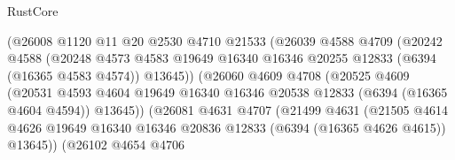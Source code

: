 \begin{lexlean}{RustCore}
\begin{coremodule}
                                (@26008
                                  @1120
                                  @11
                                  @20
                                  @2530
                                  @4710
                                  @21533
                                  (@26039
                                    @4588
                                    @4709
                                    (@20242
                                      @4588
                                      (@20248
                                        @4573
                                        @4583
                                        @19649
                                        @16340
                                        @16346
                                        @20255
                                        @12833
                                        (@6394 (@16365 @4583 @4574))
                                        @13645))
                                    (@26060
                                      @4609
                                      @4708
                                      (@20525
                                        @4609
                                        (@20531
                                          @4593
                                          @4604
                                          @19649
                                          @16340
                                          @16346
                                          @20538
                                          @12833
                                          (@6394 (@16365 @4604 @4594))
                                          @13645))
                                      (@26081
                                        @4631
                                        @4707
                                        (@21499
                                          @4631
                                          (@21505
                                            @4614
                                            @4626
                                            @19649
                                            @16340
                                            @16346
                                            @20836
                                            @12833
                                            (@6394 (@16365 @4626 @4615))
                                            @13645))
                                        (@26102
                                          @4654
                                          @4706

\end{coremodule}
\end{lexlean}
